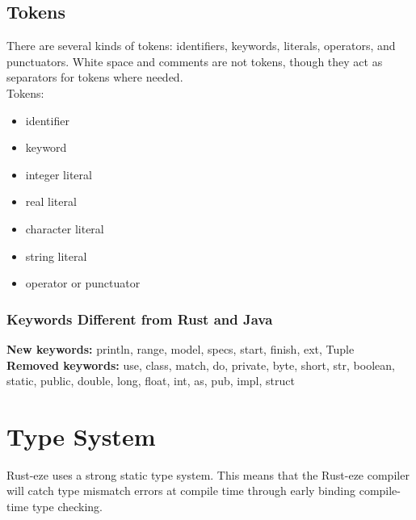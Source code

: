 \documentclass[letterpaper, 10pt, DIV=13]{scrartcl}
\numberwithin{equation}{section}
\numberwithin{figure}{section}
\numberwithin{table}{section}
\begin{document}
\subsection{Tokens}
There are several kinds of tokens: identifiers, keywords, literals, operators, 
and punctuators. White space and comments are not tokens, though they act as
separators for tokens where needed. \\
Tokens:
\begin{itemize}
    \item identifier
    \item keyword
    \item integer literal
    \item real literal
    \item character literal
    \item string literal
    \item operator or punctuator
\end{itemize}

\subsubsection{Keywords Different from Rust and Java}
\textbf{New keywords:} println, range, model, specs, start, finish, ext, Tuple \\
\textbf{Removed keywords:} use, class, match, do, private, byte, short, str,
                           boolean, static, public, double, long, float,
                           int, as, pub, impl, struct \\

\section{Type System}
Rust-eze uses a strong static type system. This means that the Rust-eze compiler
will catch type mismatch errors at compile time through early binding compile-time
type checking.
\end{document}
